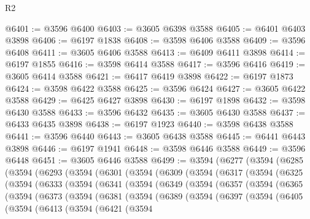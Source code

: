 \begin{lexlean}{R2}
\begin{coremodule}
@6401 := @3596 @6400
@6403 := @3605 @6398 @3588
@6405 := @6401 @6403 @3898
@6406 := @6197 @1838
@6408 := @3598 @6406 @3588
@6409 := @3596 @6408
@6411 := @3605 @6406 @3588
@6413 := @6409 @6411 @3898
@6414 := @6197 @1855
@6416 := @3598 @6414 @3588
@6417 := @3596 @6416
@6419 := @3605 @6414 @3588
@6421 := @6417 @6419 @3898
@6422 := @6197 @1873
@6424 := @3598 @6422 @3588
@6425 := @3596 @6424
@6427 := @3605 @6422 @3588
@6429 := @6425 @6427 @3898
@6430 := @6197 @1898
@6432 := @3598 @6430 @3588
@6433 := @3596 @6432
@6435 := @3605 @6430 @3588
@6437 := @6433 @6435 @3898
@6438 := @6197 @1923
@6440 := @3598 @6438 @3588
@6441 := @3596 @6440
@6443 := @3605 @6438 @3588
@6445 := @6441 @6443 @3898
@6446 := @6197 @1941
@6448 := @3598 @6446 @3588
@6449 := @3596 @6448
@6451 := @3605 @6446 @3588
@6499 := @3594
    (@6277
      (@3594
        (@6285
          (@3594
            (@6293
              (@3594
                (@6301
                  (@3594
                    (@6309
                      (@3594
                        (@6317
                          (@3594
                            (@6325
                              (@3594
                                (@6333
                                  (@3594
                                    (@6341
                                      (@3594
                                        (@6349
                                          (@3594
                                            (@6357
                                              (@3594
                                                (@6365
                                                  (@3594
                                                    (@6373
                                                      (@3594
                                                        (@6381
                                                          (@3594
                                                            (@6389
                                                              (@3594
                                                                (@6397
                                                                  (@3594
                                                                    (@6405
                                                                      (@3594
                                                                        (@6413
                                                                          (@3594
                                                                            (@6421
                                                                              (@3594

\end{coremodule}
\end{lexlean}
